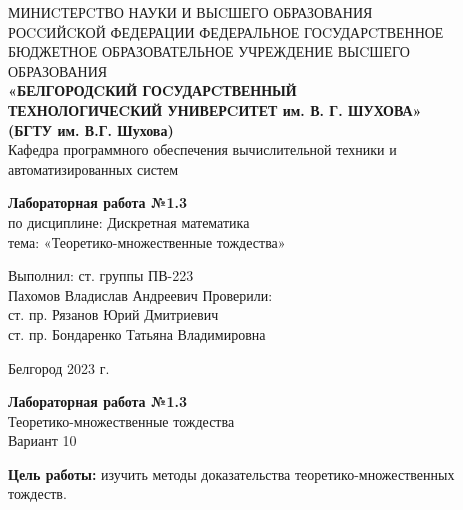 \documentclass[a4paper,14pt]{extarticle}
\newcommand\textbox[1]{
	\parbox{.45\textwidth}{#1}
}
\begin{document}
	
	\begin{center}
		\small{
			МИНИCТЕРCТВО НАУКИ И ВЫCШЕГО ОБРАЗОВАНИЯ \\РОCCИЙCКОЙ ФЕДЕРАЦИИ
			\bigbreak
			ФЕДЕРАЛЬНОЕ ГОCУДАРCТВЕННОЕ БЮДЖЕТНОЕ ОБРАЗОВАТЕЛЬНОЕ УЧРЕЖДЕНИЕ ВЫCШЕГО ОБРАЗОВАНИЯ \\
			\bigbreak
			\textbf{«БЕЛГОРОДCКИЙ ГОCУДАРCТВЕННЫЙ \\ТЕХНОЛОГИЧЕCКИЙ УНИВЕРCИТЕТ им. В. Г. ШУХОВА»\\ (БГТУ им. В.Г. Шухова)} \\
			\bigbreak
			Кафедра программного обеспечения вычислительной техники и автоматизированных систем\\}
	\end{center}
	
	\vfill
	\begin{center}
		\large{
			\textbf{
				Лабораторная работа №1.3 }}\\
		\normalsize{
			по дисциплине: Дискретная математика \\
			тема: «Теоретико-множественные тождества»}
	\end{center}
	\vfill
	\hfill\textbox{
		Выполнил: ст. группы ПВ-223\\Пахомов Владислав Андреевич
		\bigbreak
		Проверили: \\ст. пр. Рязанов Юрий Дмитриевич\\
		ст. пр. Бондаренко Татьяна Владимировна
	}
	\vfill\begin{center}
		Белгород 2023 г.
	\end{center}
	\newpage
	\begin{center}
		\textbf{Лабораторная работа №1.3}\\
		Теоретико-множественные тождества\\
		Вариант 10
	\end{center}
	\textbf{Цель работы: }изучить методы доказательства теоретико-множественных тождеств.
\end{document}

